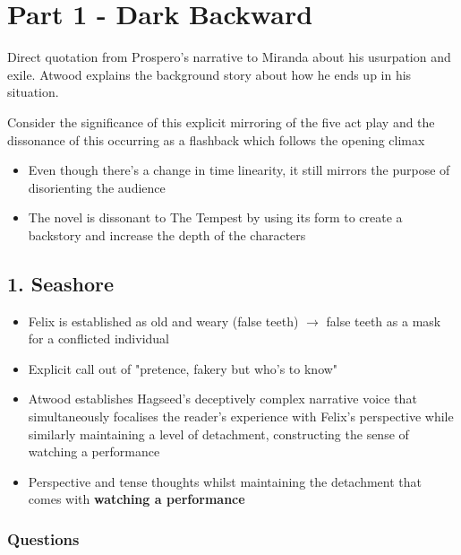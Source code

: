 \section{Part 1 - Dark Backward}

	Direct quotation from Prospero's narrative to Miranda about his usurpation and exile. Atwood explains the background story about how he ends up in his situation.

	Consider the significance of this explicit mirroring of the five act play and the dissonance of this occurring as a flashback which follows the opening climax

	\begin{itemize}
		\item Even though there's a change in time linearity, it still mirrors the purpose of disorienting the audience
		\item The novel is dissonant to The Tempest by using its form to create a backstory and increase the depth of the characters
	\end{itemize}

	\subsection{1. Seashore}
	
		\begin{itemize}
			\item Felix is established as old and weary (false teeth) $\rightarrow$ false teeth as a mask for a conflicted individual
			\item Explicit call out of "pretence, fakery but who's to know"
			\item Atwood establishes Hagseed's deceptively complex narrative voice that simultaneously focalises the reader's experience with Felix's perspective while similarly maintaining a level of detachment, constructing the sense of watching a performance
			\item Perspective and tense thoughts whilst maintaining the detachment that comes with \textbf{watching a performance}
		\end{itemize}

		\subsubsection{Questions}
		
